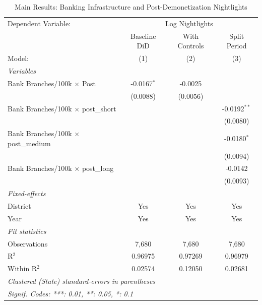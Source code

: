 
\begin{table}[htbp]
   \caption{\label{tab:main} Main Results: Banking Infrastructure and Post-Demonetization Nightlights}
   \centering
   \begin{tabular}{lccc}
      \tabularnewline \midrule \midrule
      Dependent Variable: & \multicolumn{3}{c}{Log Nightlights}\\
                                                 & Baseline DiD  & With Controls & Split Period \\   
      Model:                                     & (1)           & (2)           & (3)\\  
      \midrule
      \emph{Variables}\\
      Bank Branches/100k $\times$ Post           & -0.0167$^{*}$ & -0.0025       &   \\   
                                                 & (0.0088)      & (0.0056)      &   \\   
      Bank Branches/100k $\times$ post\_short    &               &               & -0.0192$^{**}$\\   
                                                 &               &               & (0.0080)\\   
      Bank Branches/100k $\times$ post\_medium   &               &               & -0.0180$^{*}$\\   
                                                 &               &               & (0.0094)\\   
      Bank Branches/100k $\times$ post\_long     &               &               & -0.0142\\   
                                                 &               &               & (0.0093)\\   
      \midrule
      \emph{Fixed-effects}\\
      District                                   & Yes           & Yes           & Yes\\  
      Year                                       & Yes           & Yes           & Yes\\  
      \midrule
      \emph{Fit statistics}\\
      Observations                               & 7,680         & 7,680         & 7,680\\  
      R$^2$                                      & 0.96975       & 0.97269       & 0.96979\\  
      Within R$^2$                               & 0.02574       & 0.12050       & 0.02681\\  
      \midrule \midrule
      \multicolumn{4}{l}{\emph{Clustered (State) standard-errors in parentheses}}\\
      \multicolumn{4}{l}{\emph{Signif. Codes: ***: 0.01, **: 0.05, *: 0.1}}\\
   \end{tabular}
   

\end{table}
